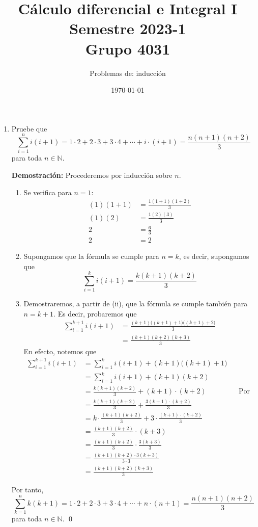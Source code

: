 \documentclass[11pt]{article}
\newcommand{\N}{\mathbb{N}}
\begin{document}
\title{\vspace{-2cm}Cálculo diferencial e Integral I \\ Semestre 2023-1 \\ Grupo 4031}
\author{Problemas de: inducción \\ }
\date{\today}
\maketitle
\thispagestyle{empty}

\begin{enumerate}
 \item Pruebe que \[ \sum_{i=1}^n i(i+1)=1\cdot2 + 2\cdot 3+3\cdot 4+\cdots + i\cdot (i+1) = \frac{n(n+1)(n+2)}{3}
  \] para toda $n\in \N$.
 
 \textbf{Demostración:} Procederemos por inducción sobre $n$. \begin{enumerate}[label=\roman*)]
  \item Se verifica para $n=1$: \begin{align*}
   (1)(1+1) &= \frac{1(1+1)(1+2)}{3}\\
   (1)(2) &= \frac{1(2)(3)}{3}\\
   2 &= \frac{6}{3}\\
   2 &= 2
  \end{align*}
  \item Supongamos que la fórmula se cumple para $n=k$, es decir, supongamos que \[ \sum_{i=1}^k i(i+1)=\frac{k(k+1)(k+2)}{3}
  \]
  \item Demostraremos, a partir de (ii), que la fórmula se cumple también para $n=k+1$. Es decir, probaremos que \begin{align*}
   \sum_{i=1}^{k+1} i(i+1) &= \frac{(k+1)\bigl((k+1)+1\bigr)\bigl((k+1)+2\bigr)}{3}\\
   &= \frac{(k+1)(k+2)(k+3)}{3}
  \end{align*}
  En efecto, notemos que \begin{align*}
   \sum_{i=1}^{k+1} i(i+1) &=\sum_{i=1}^k i(i+1) + (k+1)\bigl((k+1)+1\bigr)\\
   &=\sum_{i=1}^k i(i+1) + (k+1)(k+2)\\
   &=\frac{k(k+1)(k+2)}{3} + (k+1)\cdot (k+2) && \text{Por hipótesis	de inducción}\\
  &= \frac{k(k+1)(k+2)}{3} + \frac{3(k+1)\cdot (k+2)}{3}\\
  &= k\cdot \frac{(k+1)(k+2)}{3} + 3\cdot \frac{(k+1)\cdot (k+2)}{3}\\
  &= \frac{(k+1)(k+2)}{3} \cdot (k+3)\\
  &= \frac{(k+1)(k+2)}{3} \cdot \frac{3(k+3)}{3}\\
  &= \frac{(k+1)(k+2)\cdot 3(k+3)}{3\cdot 3}\\
  &= \frac{(k+1)(k+2)(k+3)}{3}
 \end{align*}
 \end{enumerate}
 Por tanto, \[ \sum_{k=1}^n k(k+1)=1\cdot2 + 2\cdot 3+3\cdot 4+\cdots + n\cdot (n+1) = \frac{n(n+1)(n+2)}{3}
 \] para toda $n\in \N$. \qed


\end{enumerate}
\end{document}
